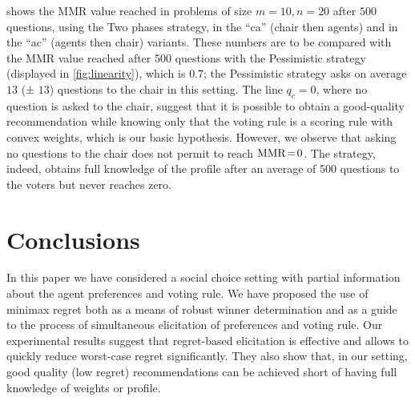 \documentclass[runningheads]{llncs}
\theoremstyle{remark}
\begin{document}
 shows the MMR value reached in problems of size $m = 10, n = 20$ after $500$ questions, using the Two phases strategy, in the “ca” (chair then agents) and in the “ac” (agents then chair) variants. These numbers are to be compared with the MMR value reached after 500 questions with the Pessimistic strategy (displayed in \cref{fig:linearity}), which is $0.7$; the Pessimistic strategy asks on average $13$ (± $13$) questions to the chair in this setting. 
The line $q_c = 0$, where no question is asked to the chair, suggest that it is possible to obtain a good-quality recommendation while knowing only that the voting rule is a scoring rule with convex weights, which is our basic hypothesis. However, we observe that asking no questions to the chair does not permit to reach $\operatorname{MMR}\!=\!0$. The strategy, indeed, obtains full knowledge of the profile after an average of 500 questions to the voters but never reaches zero.

\section{Conclusions}  
\label{sec:conclusions}
In this paper we have considered a social choice setting with partial information about the agent preferences and voting rule.
We have proposed the use of minimax regret both as a means of robust winner determination and as a guide to the process of simultaneous elicitation of preferences and voting rule.
Our experimental results %
suggest that regret-based elicitation is effective and allows to quickly reduce worst-case regret significantly. They also show that, in our setting, good quality (low regret) recommendations can be achieved short of having full knowledge of weights or profile.
\end{document}
